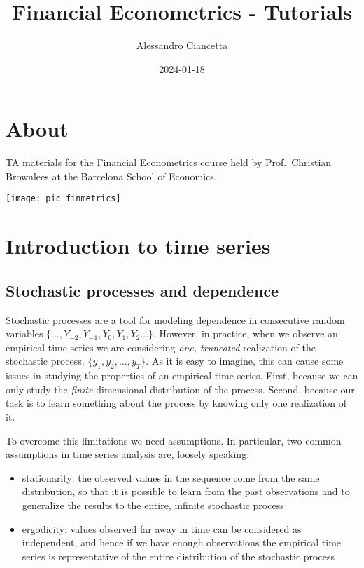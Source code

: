 \documentclass[
]{book}
\title{Financial Econometrics - Tutorials}
\author{Alessandro Ciancetta}
\date{2024-01-18}
\begin{document}
\maketitle

{
\setcounter{tocdepth}{1}
\tableofcontents
}
\hypertarget{about}{%
\chapter*{About}\label{about}}

TA materials for the Financial Econometrics course held by Prof.~Christian Brownlees at the Barcelona School of Economics.

\begin{center}\texttt{[image: pic\_finmetrics]} \end{center}

\hypertarget{session01}{%
\chapter{Introduction to time series}\label{session01}}

\hypertarget{stochastic-processes-and-dependence}{%
\section{Stochastic processes and dependence}\label{stochastic-processes-and-dependence}}

Stochastic processes are a tool for modeling dependence in consecutive random variables \(\{\dots, Y_{-2}, Y_{-1}, Y_{0}, Y_{1}, Y_{2} \dots\}\). However, in practice, when we observe an empirical time series we are considering \emph{one, truncated} realization of the stochastic process, \(\{y_1, y_2, \dots, y_T\}\). As it is easy to imagine, this can cause some issues in studying the properties of an empirical time series. First, because we can only study the \emph{finite} dimensional distribution of the process. Second, because our task is to learn something about the process by knowing only one realization of it.

To overcome this limitations we need assumptions. In particular, two common assumptions in time series analysis are, loosely speaking:

\begin{itemize}
\item
  stationarity: the observed values in the sequence come from the same distribution, so that it is possible to learn from the past observations and to generalize the results to the entire, infinite stochastic process
\item
  ergodicity: values observed far away in time can be considered as independent, and hence if we have enough observations the empirical time series is representative of the entire distribution of the stochastic process
\end{itemize}
\end{document}

